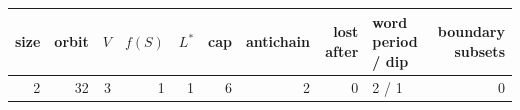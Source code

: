 \begin{tabular}{rrrrrrrrlr}
\toprule
size & orbit & $V$ & $f(S)$ & $L^\ast$ & cap & antichain & lost after & word period / dip & boundary subsets\\
\midrule
2 & 32 & $3$ & 1 & 1 & 6 & 2 & 0 & 2 / 1 & 0\\
\bottomrule
\end{tabular}
